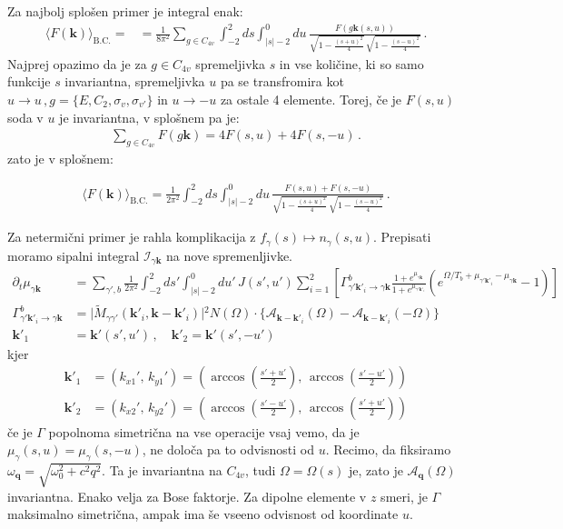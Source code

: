\documentclass[a4paper,10pt]{article}
\renewcommand{\vec}[1]{\mathbf{#1}}
\begin{document}
Za najbolj splošen primer je integral enak:
\begin{align}
\langle F(\vec{k})\rangle_{\mathrm{B.C.}} =
&=\frac1{8\pi^2} \sum_{g\in C_{4v}}
\int_{-2}^{2}ds\int_{|s|-2}^{0}du\,
\frac{F(g\vec{k}(s, u))}
{\sqrt{1-\frac{(s+u)^2}{4}}\,
 \sqrt{1-\frac{(s-u)^2}{4}}}\,.
\end{align}
Najprej opazimo da je za $g \in C_{4v}$ spremeljivka $s$ in vse količine, ki so samo funkcije $s$ invariantna, spremeljivka $u$ pa se transfromira kot $u \to u\,, g=\{E, C_2, \sigma_v, \sigma_{v'}\}$ in $u \to -u$ za ostale 4 elemente. Torej, če je $F(s, u)$ soda v $u$ je invariantna, v splošnem pa je:
\begin{align}
  \sum_{g\in C_{4v}} F(g\vec{k}) = 4 F(s, u) + 4F(s, -u)\,.
\end{align}
zato je v splošnem: 
\begin{tcolorbox}
  \begin{align}
    \langle F(\vec{k})\rangle_{\mathrm{B.C.}} =\frac1{2\pi^2} \int_{-2}^{2}ds\int_{|s|-2}^{0}du\, \frac{F(s, u) + F(s, -u)} {\sqrt{1-\frac{(s+u)^2}{4}}\,  \sqrt{1-\frac{(s-u)^2}{4}}}\,.
  \end{align}
\end{tcolorbox}
Za netermični primer je rahla komplikacija z $f_\gamma(s)\mapsto n_\gamma(s, u)$. Prepisati moramo sipalni integral  $\mathcal{I}_{\gamma \vec{k}}$ na nove spremenljivke. 
\begin{align}
\partial_t \mu_{\gamma \vec{k}} &= \sum_{\gamma', b} \frac{1}{2\pi^2} \int_{-2}^{2}ds'\int_{|s|-2}^{0}du' \, J(s', u') \sum_{i=1}^{2} \left[ {\Gamma}_{\gamma' \vec{k}'_i \to \gamma \vec{k}}^b \frac{1 + e^{\mu_{\gamma \vec{k}}}}{1 + e^{\mu_{\gamma' \vec{k}'_i}}} \left(e^{\Omega / T_b + \mu_{\gamma' \vec{k}'_i} - \mu_{\gamma \vec{k}}} - 1\right) \right] \\
{\Gamma}_{\gamma' \vec{k}'_i \to \gamma \vec{k}}^b &= \vert{}\widetilde{M}_{\gamma \gamma'}(\vec{k}'_i, \vec{k} - \vec{k}'_i)\vert{}^2 N(\Omega) \cdot \Big\{\mathcal{A}_{\vec{k} - \vec{k}'_i}(\Omega) - \mathcal{A}_{\vec{k} - \vec{k}'_i}(-\Omega)\Big\} \\
\vec{k}'_1 &= \vec{k}'(s', u')\,,\quad \vec{k}'_2 = \vec{k}'(s', -u')
\end{align}
kjer 
\begin{align}
  \vec{k}'_1 &= \left( k_{x1}', \, k_{y1}' \right) = \left( \arccos\left(\frac{s' + u'}{2}\right), \, \arccos\left(\frac{s' - u'}{2}\right) \right) \\
  \vec{k}'_2 &= \left( k_{x2}', \, k_{y2}' \right) = \left( \arccos\left(\frac{s' - u'}{2}\right), \, \arccos\left(\frac{s' + u'}{2}\right) \right)
\end{align}
če je $\Gamma$ popolnoma simetrična na vse operacije vsaj vemo, da je $\mu_\gamma(s, u) = \mu_\gamma(s, -u)$, ne določa pa to odvisnosti od $u$. Recimo, da fiksiramo $\omega_\vec{q} = \sqrt{\omega_0^2+c^2q^2}$. Ta je invariantna na $C_{4v}$,  tudi $\Omega= \Omega(s)$ je, zato je $\mathcal{A}_\vec{q}(\Omega)$ invariantna. Enako velja za Bose faktorje. Za dipolne elemente v $z$ smeri, je $\Gamma$ maksimalno simetrična, ampak ima še vseeno odvisnost od koordinate $u$. 
\end{document}
